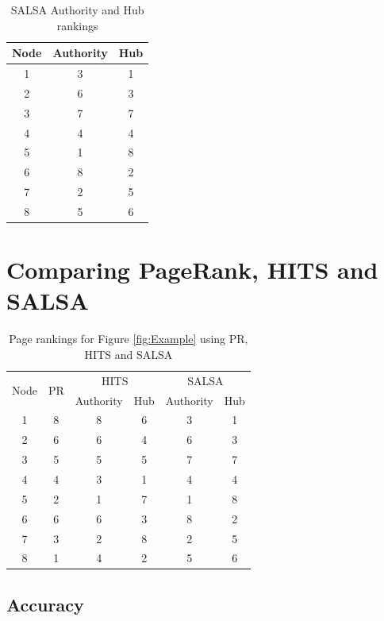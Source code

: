 \documentclass[11pt]{report}
\begin{document}
\begin{table}[H] \caption{SALSA Authority and Hub rankings}
 \centering
 \begin{tabular} {c| c c} 
 Node & Authority & Hub \\ [0.5ex] 
 \hline
 1&3&1\\
 2&6&3\\
 3&7&7\\
 4&4&4\\
 5&1&8\\
 6&8&2\\
 7&2&5\\
 8&5&6\\
 \end{tabular}
 \label{tble:SALSA}
\end{table}

\section{Comparing PageRank, HITS and SALSA} \label{sec:compare}
\begin{table}[H] \caption{Page rankings for Figure \ref{fig:Example} using PR, HITS and SALSA }
 \centering
 \begin{tabular} {c| c| c| c| c| c} 
 \multirow{2}{*}{Node} & \multirow{2}{*}{PR} & \multicolumn{2}{|c|}{HITS} & \multicolumn{2}{|c}{SALSA} \\ [0.5ex] 
 {}&{}&Authority & Hub & Authority & Hub\\ 
 \hline
 1&8&8&6&3&1\\
 2&6&6&4&6&3\\
 3&5&5&5&7&7\\
 4&4&3&1&4&4\\
 5&2&1&7&1&8\\
 6&6&6&3&8&2\\
 7&3&2&8&2&5\\
 8&1&4&2&5&6\\
 \end{tabular}
 \label{tble: comparison}
\end{table}
\subsection*{Accuracy}
\end{document}
